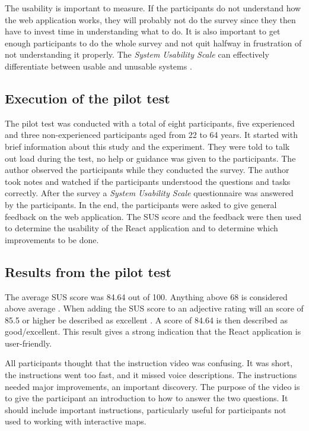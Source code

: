 The usability is important to measure. If the participants do not understand how the web application works, they will probably not do the survey since they then have to invest time in understanding what to do. %
It is also important to get enough participants to do the whole survey and not quit halfway in frustration of not understanding it properly. The \textit{System Usability Scale} can effectively differentiate between usable and unusable systems \citep{Affairs2013}. 

\subsection{Execution of the pilot test}
The pilot test was conducted with a total of eight participants, five experienced and three non-experienced participants aged from 22 to 64 years. It started with brief information about this study and the experiment. They were told to talk out load during the test, no help or guidance was given to the participants. The author observed the participants while they conducted the survey. The author took notes and watched if the participants understood the questions and tasks correctly. After the survey a \textit{System Usability Scale} questionnaire was answered by the participants. In the end, the participants were asked to give general feedback on the web application. The SUS score and the feedback were then used to determine the usability of the React application and to determine which improvements to be done.  

\subsection{Results from the pilot test}
The average SUS score was 84.64 out of 100. Anything above 68 is considered above average \citep{Affairs2013}. When adding the SUS score to an adjective rating will an score of 85.5 or higher be described as excellent \citep{Bangor2009}. A score of 84.64 is then described as good/excellent. This result gives a strong indication that the React application is user-friendly. 

All participants thought that the instruction video was confusing. It was short, the instructions went too fast, and it missed voice descriptions. The instructions needed major improvements, an important discovery. The purpose of the video is to give the participant an introduction to how to answer the two questions. It should include important instructions, particularly useful for participants not used to working with interactive maps. 

